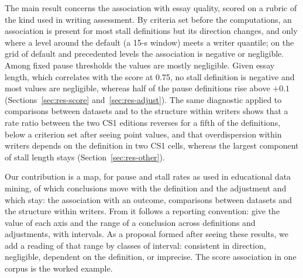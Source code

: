 The main result concerns the association with essay quality, scored on a rubric of the kind used in writing
assessment. By criteria set before the computations, an association is present for most stall definitions but its
direction changes, and only where a level around the default (a 15-s window) meets a writer quantile; on the grid of
default and precedented levels the association is negative or negligible. Among fixed pause thresholds the values are
mostly negligible. Given essay length, which correlates with the score at 0.75, no stall definition is negative and
most values are negligible, whereas half of the pause definitions rise above $+0.1$
(Sections~\ref{sec:res-score} and~\ref{sec:res-adjust}). The same diagnostic applied to comparisons between datasets
and to the structure within writers shows that a rate ratio between the two CS1 editions reverses for a fifth of the
definitions, below a criterion set after seeing point values, and that overdispersion within writers depends on the
definition in two CS1 cells, whereas the largest component of stall length stays (Section~\ref{sec:res-other}).

Our contribution is a map, for pause and stall rates as used in educational data mining, of which conclusions move
with the definition and the adjustment and which stay: the association with an outcome, comparisons between datasets
and the structure within writers. From it follows a reporting convention: give the value of each axis and the range
of a conclusion across definitions and adjustments, with intervals. As a proposal formed after seeing these results,
we add a reading of that range by classes of interval: consistent in direction, negligible, dependent on the
definition, or imprecise. The score association in one corpus is the worked example.
